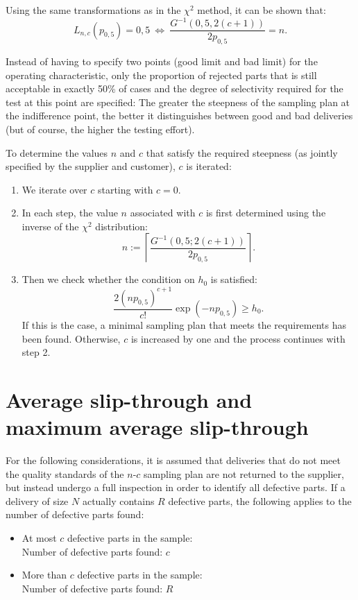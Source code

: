 \documentclass[a4paper,11pt,oneside]{article}
\begin{document}
Using the same transformations as in the $\chi^2$ method, it can be shown that:
$$
L_{n,c}(p_{0{,}5})=0{,}5 ~\iff~ \frac{G^{-1}(0{,}5,2(c+1))}{2p_{0{,}5}}=n.
$$

Instead of having to specify two points (good limit and bad limit) for the operating characteristic, only the proportion of rejected parts that is still acceptable in exactly 50\% of cases and the degree of selectivity required for the test at this point are specified: The greater the steepness of the sampling plan at the indifference point, the better it distinguishes between good and bad deliveries (but of course, the higher the testing effort).

To determine the values $n$ and $c$ that satisfy the required steepness (as jointly specified by the supplier and customer), $c$ is iterated:

\begin{enumerate}
\item
We iterate over $c$ starting with $c=0$.
\item
In each step, the value $n$ associated with $c$ is first determined using the inverse of the $\chi^2$ distribution:
$$
n:=\left\lceil\frac{G^{-1}(0{,}5;2(c+1))}{2p_{0{,}5}}\right\rceil.
$$
\item
Then we check whether the condition on $h_0$ is satisfied:
$$\frac{2(np_{0{,}5})^{c+1}}{c!}\exp(-np_{0{,}5})\ge h_0.$$
If this is the case, a minimal sampling plan that meets the requirements has been found. Otherwise, $c$ is increased by one and the process continues with step 2.
\end{enumerate}



\section{Average slip-through and maximum average slip-through}

For the following considerations, it is assumed that deliveries that do not meet the quality standards of the $n$-$c$ sampling plan are not returned to the supplier, but instead undergo a full inspection in order to identify all defective parts. If a delivery of size $N$ actually contains $R$ defective parts, the following applies to the number of defective parts found:

\begin{itemize}
\item
At most $c$ defective parts in the sample:\\
Number of defective parts found: $c$
\item
More than $c$ defective parts in the sample:\\
Number of defective parts found: $R$
\end{itemize}
\end{document}
